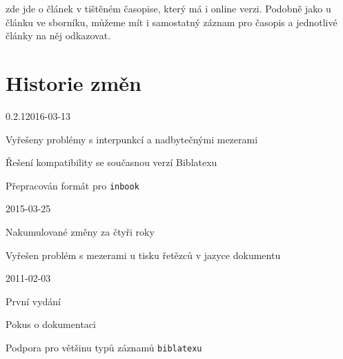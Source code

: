 \documentclass[a4paper,10pt]{ltxdockit}
\def\t|#1|{\texttt{#1}}
\begin{document}
\noindent zde jde o článek v tištěném časopise, který má i online verzi. Podobně jako u článku ve sborníku, můžeme mít i samostatný záznam pro časopis a jednotlivé články na něj odkazovat.
\nocite{*}
\printbibliography[title={Ukázková bibliografie},heading={bibnumbered}]


\section{Historie změn}
\begin{changelog}
\begin{release}{0.2.1}{2016-03-13}
\item Vyřešeny problémy s interpunkcí a nadbytečnými mezerami
\item Řešení kompatibility se současnou verzí Biblatexu
\item Přepracován formát pro \verb|inbook|
\end{release}
\begin{release}{0.2}{2015-03-25}
\item Nakumulované změny za čtyři roky
\item Vyřešen problém s mezerami u tisku řetězců v jazyce dokumentu
\end{release}
\begin{release}{0.1}{2011-02-03}
\item První vydání
\item Pokus o dokumentaci
\item Podpora pro většinu typů záznamů \t|biblatexu|
\end{release}
\end{changelog}
\end{document}
